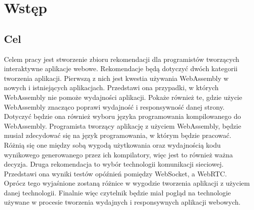 \documentclass[language=polish,type=master]{aghmodern}
\author{Piotr Szczygieł}
\date{2022}
\begin{document}
\frontmatter
\maketitle

\setcounter{tocdepth}{1}
\tableofcontents

\mainmatter

\onehalfspacing

\chapter{Wstęp}

\section{Cel}
Celem pracy jest stworzenie zbioru rekomendacji dla programistów tworzących interaktywne aplikacje webowe.
Rekomendacje będą dotyczyć dwóch kategorii tworzenia aplikacji.
Pierwszą z nich jest kwestia używania WebAssembly w nowych i istniejących aplikacjach.
Przedstawi ona przypadki, w których WebAssembly nie pomoże wydajności aplikacji.
Pokaże również te, gdzie użycie WebAssembly znacząco poprawi wydajność i responsywność danej strony.
Dotyczyć będzie ona również wyboru języka programowania kompilowanego do WebAssembly.
Programista tworzący aplikację z użyciem WebAssembly, będzie musiał zdecydować się na język programowania, w którym będzie pracować.
Różnią się one między sobą wygodą użytkowania oraz wydajnością kodu wynikowego generowanego przez ich kompilatory, więc jest to również ważna decyzja.
Druga rekomendacja to wybór technologii komunikacji sieciowej.
Przedstawi ona wyniki testów opóźnień pomiędzy WebSocket, a WebRTC.
Oprócz tego wyjaśnione zostaną różnice w wygodzie tworzenia aplikacji z użyciem danej technologii.
Finalnie więc czytelnik będzie miał pogląd na technologie używane w procesie tworzenia wydajnych i responsywnych aplikacji webowych.
\end{document}
